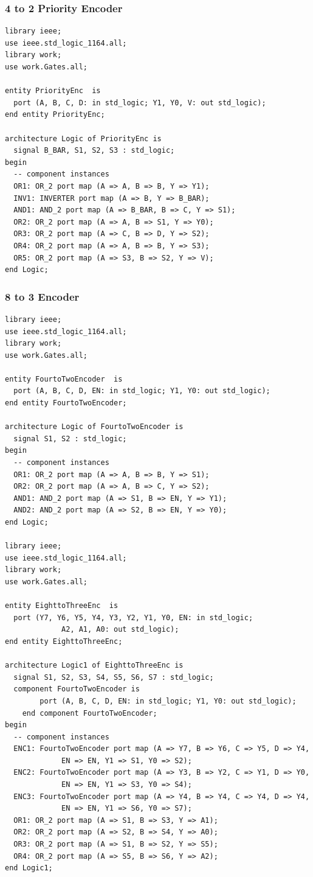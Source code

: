 \documentclass[12pt]{article}
\begin{document}
\subsubsection{4 to 2 Priority Encoder}
\begin{verbatim}
library ieee;
use ieee.std_logic_1164.all;
library work;
use work.Gates.all;

entity PriorityEnc  is
  port (A, B, C, D: in std_logic; Y1, Y0, V: out std_logic);
end entity PriorityEnc;

architecture Logic of PriorityEnc is
  signal B_BAR, S1, S2, S3 : std_logic;
begin
  -- component instances
  OR1: OR_2 port map (A => A, B => B, Y => Y1);
  INV1: INVERTER port map (A => B, Y => B_BAR);
  AND1: AND_2 port map (A => B_BAR, B => C, Y => S1);
  OR2: OR_2 port map (A => A, B => S1, Y => Y0);
  OR3: OR_2 port map (A => C, B => D, Y => S2);
  OR4: OR_2 port map (A => A, B => B, Y => S3);
  OR5: OR_2 port map (A => S3, B => S2, Y => V);
end Logic;
\end{verbatim}

\subsubsection{8 to 3 Encoder}
\begin{verbatim}
library ieee;
use ieee.std_logic_1164.all;
library work;
use work.Gates.all;

entity FourtoTwoEncoder  is
  port (A, B, C, D, EN: in std_logic; Y1, Y0: out std_logic);
end entity FourtoTwoEncoder;

architecture Logic of FourtoTwoEncoder is
  signal S1, S2 : std_logic;
begin
  -- component instances
  OR1: OR_2 port map (A => A, B => B, Y => S1);
  OR2: OR_2 port map (A => A, B => C, Y => S2);
  AND1: AND_2 port map (A => S1, B => EN, Y => Y1);
  AND2: AND_2 port map (A => S2, B => EN, Y => Y0);
end Logic;

library ieee;
use ieee.std_logic_1164.all;
library work;
use work.Gates.all;

entity EighttoThreeEnc  is
  port (Y7, Y6, Y5, Y4, Y3, Y2, Y1, Y0, EN: in std_logic; 
  			 A2, A1, A0: out std_logic);
end entity EighttoThreeEnc;

architecture Logic1 of EighttoThreeEnc is
  signal S1, S2, S3, S4, S5, S6, S7 : std_logic;
  component FourtoTwoEncoder is
		port (A, B, C, D, EN: in std_logic; Y1, Y0: out std_logic);
	end component FourtoTwoEncoder;
begin
  -- component instances
  ENC1: FourtoTwoEncoder port map (A => Y7, B => Y6, C => Y5, D => Y4, 
  			 EN => EN, Y1 => S1, Y0 => S2);
  ENC2: FourtoTwoEncoder port map (A => Y3, B => Y2, C => Y1, D => Y0,
  			 EN => EN, Y1 => S3, Y0 => S4);
  ENC3: FourtoTwoEncoder port map (A => Y4, B => Y4, C => Y4, D => Y4, 
  			 EN => EN, Y1 => S6, Y0 => S7);
  OR1: OR_2 port map (A => S1, B => S3, Y => A1);
  OR2: OR_2 port map (A => S2, B => S4, Y => A0);
  OR3: OR_2 port map (A => S1, B => S2, Y => S5);
  OR4: OR_2 port map (A => S5, B => S6, Y => A2);
end Logic1;
\end{verbatim}
\end{document}
